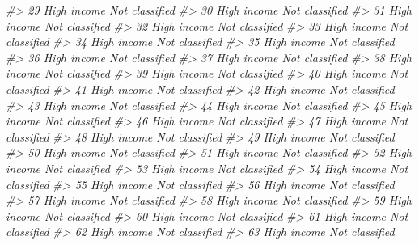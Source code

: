 \documentclass[
  xelatex, ja=standard]{bxjsbook}
\newenvironment{Shaded}{\begin{snugshade}}{\end{snugshade}}
\newcommand{\CommentTok}[1]{\textcolor[rgb]{0.56,0.35,0.01}{\textit{#1}}}
\theoremstyle{definition}
\theoremstyle{definition}
\theoremstyle{definition}
\theoremstyle{definition}
\theoremstyle{remark}
\begin{document}
\begin{Shaded}
\begin{Highlighting}[]
\CommentTok{\#\textgreater{} 29 High income Not classified}
\CommentTok{\#\textgreater{} 30 High income Not classified}
\CommentTok{\#\textgreater{} 31 High income Not classified}
\CommentTok{\#\textgreater{} 32 High income Not classified}
\CommentTok{\#\textgreater{} 33 High income Not classified}
\CommentTok{\#\textgreater{} 34 High income Not classified}
\CommentTok{\#\textgreater{} 35 High income Not classified}
\CommentTok{\#\textgreater{} 36 High income Not classified}
\CommentTok{\#\textgreater{} 37 High income Not classified}
\CommentTok{\#\textgreater{} 38 High income Not classified}
\CommentTok{\#\textgreater{} 39 High income Not classified}
\CommentTok{\#\textgreater{} 40 High income Not classified}
\CommentTok{\#\textgreater{} 41 High income Not classified}
\CommentTok{\#\textgreater{} 42 High income Not classified}
\CommentTok{\#\textgreater{} 43 High income Not classified}
\CommentTok{\#\textgreater{} 44 High income Not classified}
\CommentTok{\#\textgreater{} 45 High income Not classified}
\CommentTok{\#\textgreater{} 46 High income Not classified}
\CommentTok{\#\textgreater{} 47 High income Not classified}
\CommentTok{\#\textgreater{} 48 High income Not classified}
\CommentTok{\#\textgreater{} 49 High income Not classified}
\CommentTok{\#\textgreater{} 50 High income Not classified}
\CommentTok{\#\textgreater{} 51 High income Not classified}
\CommentTok{\#\textgreater{} 52 High income Not classified}
\CommentTok{\#\textgreater{} 53 High income Not classified}
\CommentTok{\#\textgreater{} 54 High income Not classified}
\CommentTok{\#\textgreater{} 55 High income Not classified}
\CommentTok{\#\textgreater{} 56 High income Not classified}
\CommentTok{\#\textgreater{} 57 High income Not classified}
\CommentTok{\#\textgreater{} 58 High income Not classified}
\CommentTok{\#\textgreater{} 59 High income Not classified}
\CommentTok{\#\textgreater{} 60 High income Not classified}
\CommentTok{\#\textgreater{} 61 High income Not classified}
\CommentTok{\#\textgreater{} 62 High income Not classified}
\CommentTok{\#\textgreater{} 63 High income Not classified}
\end{Highlighting}
\end{Shaded}
\end{document}
